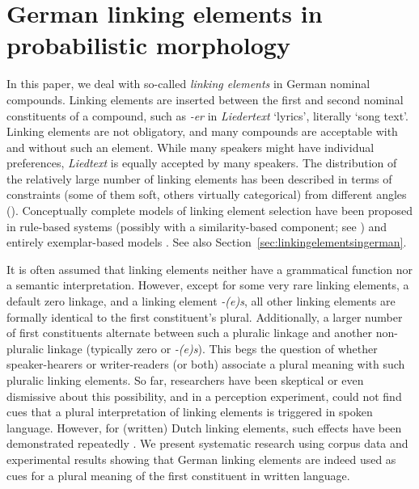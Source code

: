 \section{German linking elements in probabilistic morphology}
\label{sec:germanlinkingelementsinprobabilisticmorphology}

In this paper, we deal with so-called \textit{linking elements} in German nominal compounds.
Linking elements are inserted between the first and second nominal constituents of a compound, such as \textit{-er} in \textit{Liedertext} `lyrics', literally `song text'.
Linking elements are not obligatory, and many compounds are acceptable with and without such an element.
While many speakers might have individual preferences, \textit{Liedtext} is equally accepted by many speakers.
The distribution of the relatively large number of linking elements has been described in terms of constraints (some of them soft, others virtually categorical) from different angles (\egg \citealt{Fuhrhop1996,Wegener2003,Schluecker2012,NueblingSzczepaniak2013,FuhrhopKuerschner2015}).
Conceptually complete models of linking element selection have been proposed in rule-based systems (possibly with a similarity-based component; see \citealt{DresslerEa2001}) and entirely exemplar-based models \parencite{KrottEa2007}.
See also Section~\ref{sec:linkingelementsingerman}.

It is often assumed that linking elements neither have a grammatical function nor a semantic interpretation.
However, except for some very rare linking elements, a default zero linkage, and a linking element \textit{-(e)s}, all other linking elements are formally identical to the first constituent's plural.
Additionally, a larger number of first constituents alternate between such a pluralic linkage and another non-pluralic linkage (typically zero or \textit{-(e)s}).
This begs the question of whether speaker-hearers or writer-readers (or both) associate a plural meaning with such pluralic linking elements.
So far, researchers have been skeptical or even dismissive about this possibility, and in a perception experiment, \textcite{KoesterEa2004} could not find cues that a plural interpretation of linking elements is triggered in spoken language.
However, for (written) Dutch linking elements, such effects have been demonstrated repeatedly \parencite{SchreuderEa1998,BangaEa2012,BangaEa2013a,BangaEa2013b}.
We present systematic research using corpus data and experimental results showing that German linking elements are indeed used as cues for a plural meaning of the first constituent in written language.

